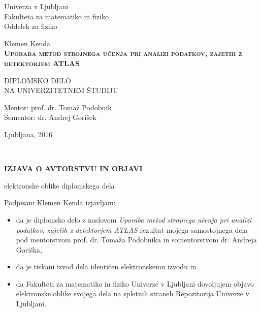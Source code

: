 
\thispagestyle{empty} 
\begin{center}
{\large 
Univerza v Ljubljani\\
Fakulteta za matematiko in fiziko\\
Oddelek za fiziko
}

\vspace{3cm}
{\LARGE Klemen Kenda}\\

\vspace{2cm}
\textsc{\textbf{
\LARGE 
Uporaba metod strojnega učenja pri analizi podatkov, zajetih z detektorjem ATLAS }}

\vspace{2cm}
{ DIPLOMSKO DELO}\\
{ NA UNIVERZITETNEM ŠTUDIJU\\}

\vspace{2cm} 
{\Large Mentor: prof. dr. Tomaž Podobnik} \\
{\Large Somentor: dr. Andrej Gorišek}

\vfill
{\Large Ljubljana, 2016}
\end{center}

\newpage

\ \thispagestyle{empty}
\newpage

\thispagestyle{empty}

\vspace{1cm}
\begin{center} 
{\Large \textbf{IZJAVA O AVTORSTVU IN OBJAVI}}
\end{center}

\begin{center} 
{\Large elektronske oblike diplomskega dela}
\end{center}

\vspace{1cm}
Podpisani Klemen Kenda izjavljam:

\begin{itemize}
	\item da je diplomsko delo z naslovom \textit{Uporaba metod strojnega učenja pri analizi podatkov, zajetih z detektorjem ATLAS} rezultat mojega samostojnega dela pod mentorstvom prof. dr. Tomaža Podobnika in somentorstvom dr. Andreja Goriška,
	\item da je tiskani izvod dela identičen elektronskemu izvodu in 
	\item da Fakulteti za matematiko in fiziko Univerze v Ljubljani dovoljujem objavo elektronske oblike svojega dela na spletnih straneh Repozitorija Univerze v Ljubljani.
\end{itemize}


